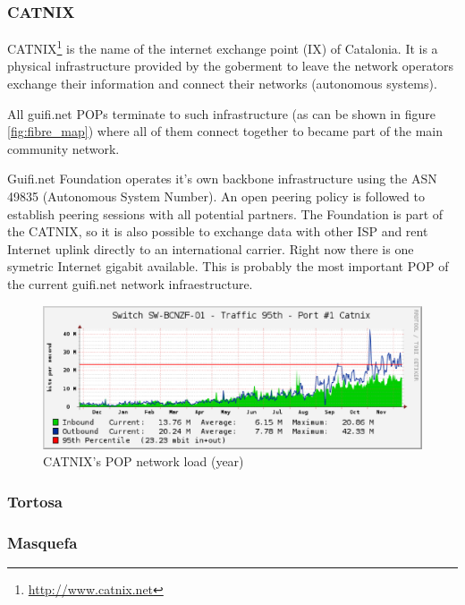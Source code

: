 \subsubsection{CATNIX}

\bigskip 

CATNIX\footnote{\url{http://www.catnix.net}} is the name of the internet exchange point (IX) of Catalonia. 
It is a physical infrastructure provided by the goberment to leave the network operators exchange their 
information and connect their networks (autonomous systems). 

\medskip
All guifi.net POPs terminate to such infrastructure (as can be shown in figure \ref{fig:fibre_map}) where
all of them connect together to became part of the main community network. 

\medskip
Guifi.net Foundation operates it's own backbone infrastructure using the ASN 49835 (Autonomous System Number). 
An open peering policy is followed to establish peering sessions with all potential partners.
The Foundation is part of the CATNIX, so it is also possible to exchange data with other ISP and
rent Internet uplink directly to an international carrier. Right now there is one symetric Internet gigabit 
available. 
\newline
This is probably the most important POP of the current guifi.net network infraestructure.


\begin{figure}[htbp]
  \centering
  \includegraphics[scale=.65]{sect3/figures/catnix_network_load_year.eps} 
  \caption{CATNIX's POP network load (year)}
  \label{fig:vic_net_load}
\end{figure}


\subsubsection{Tortosa}


\subsubsection{Masquefa}


